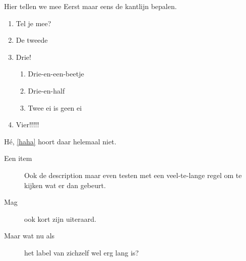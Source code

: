 \documentclass[department=none, notes={show notes}, slidesperpage=4, official=true, handout]{beamerruhuisstijl}
\begin{document}
\begin{frame}{Hier tellen we mee}
    Eerst maar eens de kantlijn bepalen.
    \begin{enumerate}
        \item Tel je mee?
        \item De tweede
        \item Drie!
        \begin{enumerate}
            \item Drie-en-een-beetje
            \item Drie-en-half
            \item \label{haha} Twee ei is geen ei
        \end{enumerate}
        \item Vier!!!!!
    \end{enumerate}

    H\'e, \ref{haha} hoort daar helemaal niet.

    \begin{description}
        \item[Een item] Ook de description maar even testen met een veel-te-lange regel om te kijken wat er dan gebeurt.
        \item[Mag] ook kort zijn uiteraard.
        \item[Maar wat nu als] het label van zichzelf wel erg lang is?
    \end{description}
\end{frame}
\end{document}
